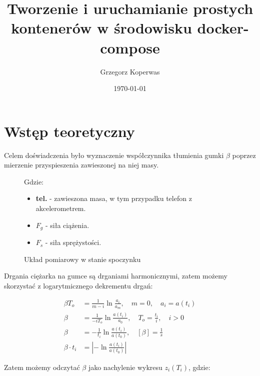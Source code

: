 \documentclass[a4paper,12pt]{article}
\title{Tworzenie i uruchamianie prostych kontenerów w środowisku  docker-compose}
\author{Grzegorz Koperwas}
\date{\today}
\begin{document}


\section{Wstęp teoretyczny}

Celem doświadczenia było wyznaczenie współczynnika tłumienia gumki $\beta$ poprzez mierzenie przyspieszenia zawieszonej na niej masy.

\begin{figure}[h]
	\centering
	\begin{flushleft}
		Gdzie:
		\begin{itemize}
			\item \textbf{tel.} - zawieszona masa, w tym przypadku telefon z akcelerometrem.
			\item $F_g$ - siła ciążenia.
			\item $F_s$ - siła sprężystości.
		\end{itemize}
	\end{flushleft}
	\caption{Układ pomiarowy w stanie spoczynku}
\end{figure}

Drgania ciężarka na gumce są drganiami harmonicznymi, zatem możemy skorzystać z logarytmicznego dekrementu drgań:

\begin{align*}
	\beta T_o &= \frac{1}{m - i} \ln \frac{a_i}{a_m},\quad m = 0,\quad  a_i = a\left(t_i\right) \\
	\beta &= \frac{1}{ - iT_o}\ln \frac{a\left(t_i\right)}{a_0},\quad T_o = \frac{t_i}{i},\quad i > 0 \\
	\beta &= - \frac{1}{t_i} \ln \frac{a\left(t_i\right)}{a\left(t_0\right)},\quad \left[\beta\right] = \frac{1}{s} \\
	\beta \cdot t_i &= \left| - \ln \frac{a\left(t_i\right)}{a\left(t_0\right)} \right|
\end{align*}

Zatem możemy odczytać $\beta$ jako nachylenie wykresu $z_i\left(T_i\right)$, gdzie:
\end{document}

